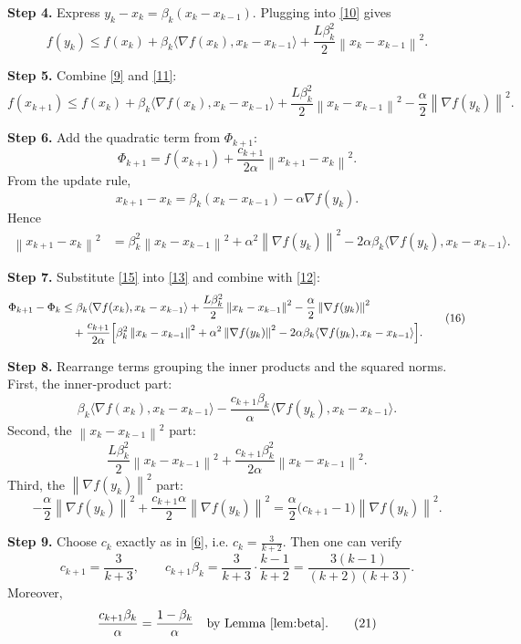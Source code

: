 \documentclass{article}
\newcommand{\norm}[1]{\left\|#1\right\|}
\newcommand{\inner}[2]{\langle #1,#2\rangle}
\begin{document}
\noindent\textbf{Step 4.}  Express $y_{k}-x_{k}= \beta_{k}(x_{k}-x_{k-1})$. Plugging into \eqref{10} gives
\[
f(y_{k})\le f(x_{k})+\beta_{k}\inner{\nabla f(x_{k})}{x_{k}-x_{k-1}}
+\frac{L\beta_{k}^{2}}{2}\norm{x_{k}-x_{k-1}}^{2}.
\tag{11}
\]

\noindent\textbf{Step 5.}  Combine \eqref{9} and \eqref{11}:
\[
f(x_{k+1})\le f(x_{k})+\beta_{k}\inner{\nabla f(x_{k})}{x_{k}-x_{k-1}}
+\frac{L\beta_{k}^{2}}{2}\norm{x_{k}-x_{k-1}}^{2}
-\frac{\alpha}{2}\norm{\nabla f(y_{k})}^{2}.
\tag{12}
\]

\noindent\textbf{Step 6.}  Add the quadratic term from $\Phi_{k+1}$:
\[
\Phi_{k+1}=f(x_{k+1})+\frac{c_{k+1}}{2\alpha}\norm{x_{k+1}-x_{k}}^{2}.
\tag{13}
\]
From the update rule,
\[
x_{k+1}-x_{k}= \beta_{k}(x_{k}-x_{k-1})-\alpha\nabla f(y_{k}).
\tag{14}
\]
Hence
\[
\begin{aligned}
\norm{x_{k+1}-x_{k}}^{2}
&= \beta_{k}^{2}\norm{x_{k}-x_{k-1}}^{2}
+\alpha^{2}\norm{\nabla f(y_{k})}^{2}
-2\alpha\beta_{k}\inner{\nabla f(y_{k})}{x_{k}-x_{k-1}}.
\end{aligned}
\tag{15}
\]

\noindent\textbf{Step 7.}  Substitute \eqref{15} into \eqref{13} and combine with \eqref{12}:
\[
\begin{aligned}
\Phi_{k+1}-\Phi_{k}
&\le
\beta_{k}\inner{\nabla f(x_{k})}{x_{k}-x_{k-1}}
+\frac{L\beta_{k}^{2}}{2}\norm{x_{k}-x_{k-1}}^{2}
-\frac{\alpha}{2}\norm{\nabla f(y_{k})}^{2}\\
&\quad
+\frac{c_{k+1}}{2\alpha}\Bigl[
\beta_{k}^{2}\norm{x_{k}-x_{k-1}}^{2}
+\alpha^{2}\norm{\nabla f(y_{k})}^{2}
-2\alpha\beta_{k}\inner{\nabla f(y_{k})}{x_{k}-x_{k-1}}
\Bigr].
\end{aligned}
\tag{16}
\]

\noindent\textbf{Step 8.}  Rearrange terms grouping the inner products and the squared norms.
First, the inner‑product part:
\[
\beta_{k}\inner{\nabla f(x_{k})}{x_{k}-x_{k-1}}
-\frac{c_{k+1}\beta_{k}}{\alpha}\inner{\nabla f(y_{k})}{x_{k}-x_{k-1}}.
\tag{17}
\]
Second, the $\norm{x_{k}-x_{k-1}}^{2}$ part:
\[
\frac{L\beta_{k}^{2}}{2}\norm{x_{k}-x_{k-1}}^{2}
+\frac{c_{k+1}\beta_{k}^{2}}{2\alpha}\norm{x_{k}-x_{k-1}}^{2}.
\tag{18}
\]
Third, the $\norm{\nabla f(y_{k})}^{2}$ part:
\[
-\frac{\alpha}{2}\norm{\nabla f(y_{k})}^{2}
+\frac{c_{k+1}\alpha}{2}\norm{\nabla f(y_{k})}^{2}
=
\frac{\alpha}{2}\bigl(c_{k+1}-1\bigr)\norm{\nabla f(y_{k})}^{2}.
\tag{19}
\]

\noindent\textbf{Step 9.}  Choose $c_{k}$ exactly as in \eqref{6}, i.e. $c_{k}= \frac{3}{k+2}$.  
Then one can verify
\[
c_{k+1}= \frac{3}{k+3},\qquad
c_{k+1}\beta_{k}= \frac{3}{k+3}\cdot\frac{k-1}{k+2}
= \frac{3(k-1)}{(k+2)(k+3)}.
\tag{20}
\]
Moreover,
\[
\frac{c_{k+1}\beta_{k}}{\alpha}
=
\frac{1-\beta_{k}}{\alpha}
\quad\text{by Lemma \ref{lem:beta}}.
\tag{21}
\]
\end{document}
